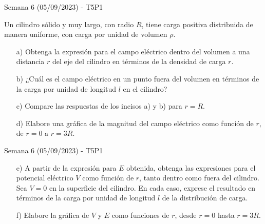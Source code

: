 \begin{frame}{Semana 6 (05/09/2023) - T5P1}
    
Un cilindro sólido y muy largo, con radio $R$, tiene carga positiva distribuida de manera uniforme, con carga por unidad de volumen $\rho$. 

\begin{itemize}
    \item[a)] Obtenga la expresión para el campo eléctrico dentro del volumen a una distancia $r$ del eje del cilindro en términos de la densidad de carga $r$.
    \item[b)] ¿Cuál es el campo eléctrico en un punto fuera del volumen en términos de la carga por unidad de longitud $l$ en el cilindro?
    \item[c)] Compare las respuestas de los incisos a) y  b) para $r = R$. 
    \item[d)] Elabore una gráfica de la magnitud del campo eléctrico como función de $r$, de $r = 0$ a $r = 3R$.
\end{itemize}

\end{frame}

\begin{frame}{Semana 6 (05/09/2023) - T5P1}
    \begin{itemize}
    
        \item[e)] A partir de la expresión para $E$ obtenida, obtenga las expresiones para el potencial eléctrico $V$ como
función de $r$, tanto dentro como fuera del cilindro. Sea $V = 0$ en la superficie del cilindro. En cada caso, exprese el resultado en términos de la
carga por unidad de longitud $l$ de la distribución de carga.
\item[f)] Elabore 
la gráfica de $V$ y $E$ como funciones de $r$, desde $r = 0$ hasta $r = 3R$.
    \end{itemize}
\end{frame}

